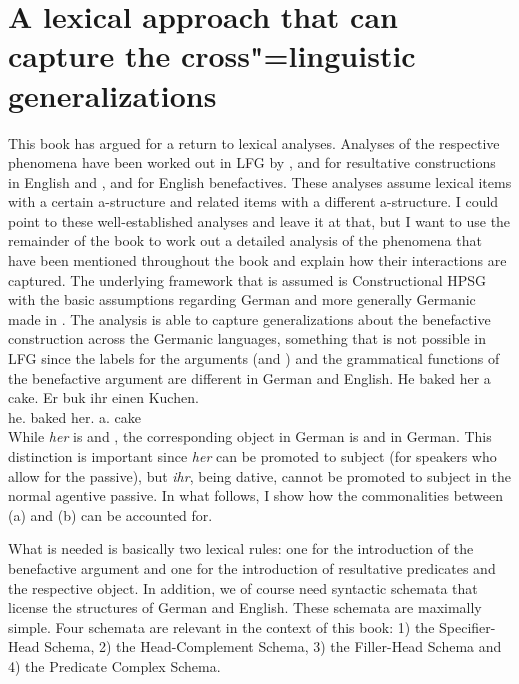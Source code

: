 \chapter{A lexical approach that can capture the cross"=linguistic generalizations}
\label{sec-lexical-approach-hpsg}

This book has argued for a return to lexical analyses. Analyses of the respective phenomena have been
worked out in LFG by \citet{Simpson83a}, \citet{BZ90a} and \citet{Christie2015a-u} for resultative
constructions in English and \citet{Cook2006a-u}, \citet{Kibort2008a} and \citet{Toivonen2013a} for
English benefactives. These analyses assume lexical items with a certain a-structure and related items
with a different a-structure. I could point to these well-established analyses and leave it at that,
but I want to use the remainder of the book to work out a detailed analysis of the phenomena that
have been mentioned throughout the book and explain how their interactions are captured. The
underlying framework that is assumed is Constructional HPSG \citep{Sag97a} with the basic assumptions regarding
German and more generally Germanic made in .
The analysis is able to capture generalizations about the benefactive construction across the
Germanic languages, something that is not possible in LFG since the labels for the arguments
(\argtwo and \argthree) and the grammatical functions of the benefactive argument are different in
German and English.
\eal
\ex He baked her a cake.
\ex 
\gll Er buk ihr einen Kuchen.\\
     he.\nom{} baked her.\dat{} a.\acc{} cake\\
\zl
While \emph{her} is \argtwo and \obj, the corresponding object in German is \argthree and \objtheta
in German. This distinction is important since \emph{her} can be promoted to subject (for speakers
who allow for the passive), but \emph{ihr}, being dative, cannot be promoted to subject in the
normal agentive passive. In what follows, I show how the commonalities between (a) and
(b) can be accounted for.

\largerpage
What is needed is basically two lexical rules: one for the introduction of the
benefactive argument and one for the introduction of resultative predicates and the respective
object. In addition, we of course need syntactic schemata that license the structures of German and
English. These schemata are maximally simple. Four schemata are relevant in the context of this
book: 1) the Specifier-Head Schema, 2) the Head-Complement Schema, 3) the Filler-Head Schema and 4)
the Predicate Complex Schema.

